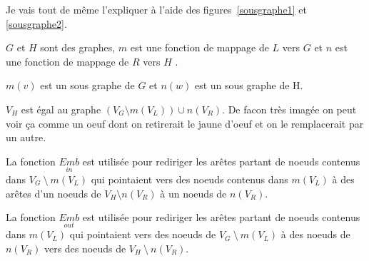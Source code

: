 \documentclass[a4paper, 12pt]{article}
\begin{document}
  Je vais tout de même l'expliquer à l'aide des figures~\ref{sousgraphe1} et \ref{sousgraphe2}.

  \(G\) et \(H\) sont des graphes, \(m\) est une fonction de mappage de \(L\) vers \(G\) et \(n\) est une fonction de mappage de \(R\)  vers \(H\) .

  \(m(v)\) est un sous graphe de \(G\) et \(n(w)\) est un sous graphe de H.

  {$V_H$} est égal au graphe \(({V_G} \setminus m({V_L})) \cup n({V_R})\). De facon très imagée on peut voir ça comme un oeuf dont on retirerait le jaune d'oeuf et on le remplacerait par un autre.

  La fonction $\underset{in}{Emb}$ est utilisée pour rediriger les arêtes partant de noeuds contenus dans \( {V_G}~\setminus~m({V_L}) \)
  qui pointaient vers des noeuds contenus dans \( m({V_L}) \) à des arêtes d'un noeuds de \( {V_H} \setminus n({V_R}) \) à un noeuds de \( n({V_R}) \).

  La fonction $\underset{out}{Emb}$ est utilisée pour rediriger les arêtes partant de noeuds contenus dans \( m({V_L}) \)
  qui pointaient vers des noeuds de \( {V_G}~\setminus~m({V_L}) \) à des noeuds de \(n({V_R}) \) vers des noeuds de \( {V_H}~\setminus~n({V_R}) \).
\end{document}
